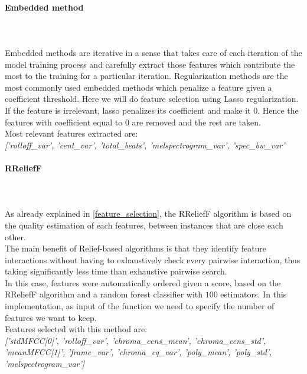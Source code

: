 \paragraph{Embedded method}
\mbox{} \\ \\
Embedded methods are iterative in a sense that takes care of each iteration of the model training process and carefully extract those features which contribute the most to the training for a particular iteration. Regularization methods are the most commonly used embedded methods which penalize a feature given a coefficient threshold.
Here we will do feature selection using Lasso regularization. If the feature is irrelevant, lasso penalizes its coefficient and make it $0$. Hence the features with coefficient equal to $0$ are removed and the rest are taken.
\\
Most relevant features extracted are:
\\ \linebreak 
\textit{['rolloff\_var', 'cent\_var', 'total\_beats', 'melspectrogram\_var', 'spec\_bw\_var'}

\paragraph{RReliefF}
\mbox{} \\ \\
As already explained in \ref{feature_selection}, the RReliefF algorithm is based on the quality estimation of each features, between instances that are close each other.
\\
The main benefit of Relief-based algorithms is that they identify feature interactions without having to exhaustively check every pairwise interaction, thus taking significantly less time than exhaustive pairwise search.
\\
In this case, features were automatically ordered given a score, based on the RReliefF algorithm and a random forest classifier with $100$ estimators. In this implementation, as input of the function we need to specify the number of features we want to keep.
\\
Features selected with this method are:
\\ \linebreak 
\textit{['stdMFCC[0]',	 'rolloff\_var', 'chroma\_cens\_mean', 'chroma\_cens\_std', 'meanMFCC[1]', 'frame\_var', 'chroma\_cq\_var', 'poly\_mean', 'poly\_std', 'melspectrogram\_var']}

